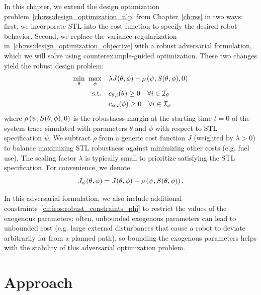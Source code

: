 In this chapter, we extend the design optimization problem~\eqref{ch:rss:design_optimization_nlp} from Chapter~\ref{ch:rss} in two ways: first, we incorporate STL into the cost function to specify the desired robot behavior. Second, we replace the variance regularization in~\eqref{ch:rss:design_optimization_objective} with a robust adversarial formulation, which we will solve using counterexample-guided optimization. These two changes yield the robust design problem:
%
\begin{subequations}\label{ch:iros:robust_nlp_generic}
    \begin{align}
        \min_\theta\ \max_\phi & \quad \lambda J(\theta, \phi) - \rho\left( \psi, S(\theta, \phi), 0 \right)  \label{ch:iros:robust_objective_generic}          \\
        \text{s.t.}            & \quad c_{\theta, i}(\theta) \geq 0 \quad \forall i \in \mathcal{I}_{\theta} \label{ch:iros:robust_constraints_theta} \\
                               & \quad c_{\phi, i}(\phi) \geq 0 \quad \forall i \in \mathcal{I}_{\phi} \label{ch:iros:robust_constraints_phi}
    \end{align}
\end{subequations}
%
where $\rho\left( \psi, S(\theta, \phi), 0 \right)$ is the robustness margin at the starting time $t=0$ of the system trace simulated with parameters $\theta$ and $\phi$ with respect to STL specification $\psi$. We subtract $\rho$ from a generic cost function $J$ (weighted by $\lambda > 0$) to balance maximizing STL robustness against minimizing other costs (e.g. fuel use). The scaling factor $\lambda$ is typically small to prioritize satisfying the STL specification. For convenience, we denote
\begin{equation}
    J_\psi(\theta, \phi) = J(\theta, \phi) - \rho\left( \psi, S(\theta, \phi) \right).
\end{equation}

In this adversarial formulation, we also include additional constraints~\eqref{ch:iros:robust_constraints_phi} to restrict the values of the exogenous parameters; often, unbounded exogenous parameters can lead to unbounded cost (e.g. large external disturbances that cause a robot to deviate arbitrarily far from a planned path), so bounding the exogenous parameters helps with the stability of this adversarial optimization problem.

\section{Approach}

